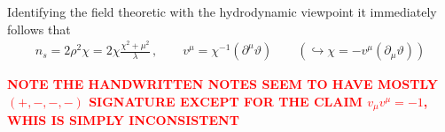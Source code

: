 Identifying the field theoretic with the hydrodynamic viewpoint it immediately follows that
\begin{subequations}
    \begin{gather}
        n_s=2\rho^2\chi=2\chi\frac{\chi^2+\mu^2}{\lambda}\,,\qquad v^\mu=\chi^{-1}(\partial^\mu\vartheta)\qquad(\hookrightarrow\chi=-v^\mu(\partial_\mu\vartheta))
    \end{gather}
\end{subequations}

\textcolor{red}{\textbf{NOTE THE HANDWRITTEN NOTES SEEM TO HAVE MOSTLY $(+,-,-,-)$ SIGNATURE EXCEPT FOR THE CLAIM $v_\mu v^\mu=-1$, WHIS IS SIMPLY INCONSISTENT}}
